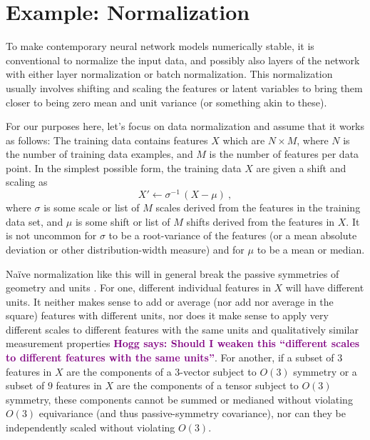 \documentclass[preprint]{article} %
\newcommand{\hogg}[1]{\textcolor{purple}{\textbf{Hogg says: #1}}}
\begin{document}
\section{Example: Normalization}\label{sec:norm}
To make contemporary neural network models numerically stable, it is conventional to normalize the input data, and possibly also layers of the network with either layer normalization or batch normalization.
This normalization usually involves shifting and scaling the features or latent variables to bring them closer to being zero mean and unit variance (or something akin to these).

For our purposes here, let's focus on data normalization and assume that it works as follows:
The training data contains features $X$ which are $N\times M$, where $N$ is the number of training data examples, and $M$ is the number of features per data point.
In the simplest possible form, the training data $X$ are given a shift and scaling as
\begin{equation}
    X' \leftarrow \sigma^{-1}\,(X - \mu) ~,
\end{equation}
where $\sigma$ is some scale or list of $M$ scales derived from the features in the training data set, and $\mu$ is some shift or list of $M$ shifts derived from the features in $X$.
It is not uncommon for $\sigma$ to be a root-variance of the features (or a mean absolute deviation or other distribution-width measure) and for $\mu$ to be a mean or median.

Na\"ive normalization like this will in general break the passive symmetries of geometry and units \citep{aalto2022geometric}.
For one, different individual features in $X$ will have different units.
It neither makes sense to add or average (nor add nor average in the square) features with different units, nor does it make sense to apply very different scales to different features with the same units and qualitatively similar measurement properties \hogg{Should I weaken this ``different scales to different features with the same units''}.
For another, if a subset of $3$ features in $X$ are the components of a 3-vector subject to $O(3)$ symmetry or a subset of $9$ features in $X$ are the components of a tensor subject to $O(3)$ symmetry, these components cannot be summed or medianed without violating $O(3)$ equivariance (and thus passive-symmetry covariance), nor can they be independently scaled without violating $O(3)$.
\end{document}
